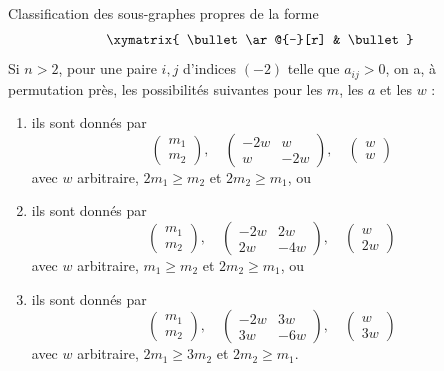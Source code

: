 \begin{lemma}
\label{lemma-two-by-two}
Classification des sous-graphes propres de la forme
$$
\xymatrix{
\bullet \ar@{-}[r] & \bullet
}
$$
Si $n > 2$, pour une paire $i, j$ d'indices $(-2)$ telle que $a_{ij} > 0$,
on a, à permutation près, les possibilités suivantes pour les $m$, les $a$ et les $w$ :
\begin{enumerate}
\item
\label{item-A2}
ils sont donnés par
$$
\left(
\begin{matrix}
m_1 \\
m_2
\end{matrix}
\right),
\quad
\left(
\begin{matrix}
-2w & w \\
w & -2w
\end{matrix}
\right),
\quad
\left(
\begin{matrix}
w \\
w
\end{matrix}
\right)
$$
avec $w$ arbitraire, $2m_1 \geq m_2$ et $2m_2 \geq m_1$, ou
\item
\label{item-B2}
ils sont donnés par
$$
\left(
\begin{matrix}
m_1 \\
m_2
\end{matrix}
\right),
\quad
\left(
\begin{matrix}
-2w & 2w \\
2w & -4w
\end{matrix}
\right),
\quad
\left(
\begin{matrix}
w \\
2w
\end{matrix}
\right)
$$
avec $w$ arbitraire, $m_1 \geq m_2$ et $2m_2 \geq m_1$, ou
\item
\label{item-G2}
ils sont donnés par
$$
\left(
\begin{matrix}
m_1 \\
m_2
\end{matrix}
\right),
\quad
\left(
\begin{matrix}
-2w & 3w \\
3w & -6w
\end{matrix}
\right),
\quad
\left(
\begin{matrix}
w \\
3w
\end{matrix}
\right)
$$
avec $w$ arbitraire, $2m_1 \geq 3m_2$ et $2m_2 \geq m_1$.
\end{enumerate}
\end{lemma}

